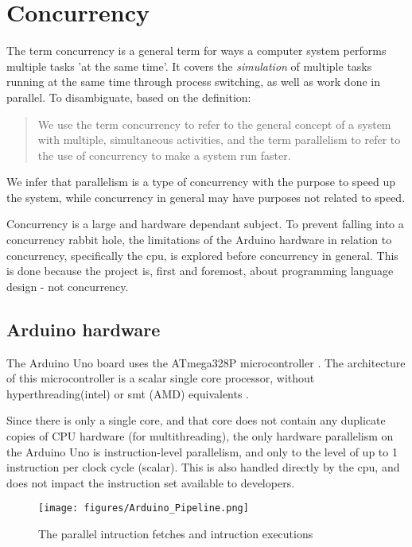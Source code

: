\section{Concurrency}\label{sec:concurrency}
The term concurrency is a general term for ways a computer system performs multiple tasks 'at the same time'. It covers the \textit{simulation} of multiple tasks running at the same time through process switching, as well as work done in parallel. To disambiguate, based on the definition:

\blockcquote{Bryant2016}{We use the term concurrency to refer to the general concept of a system with multiple, simultaneous activities, and the term parallelism to refer to the use of concurrency to make a system run faster.}

We infer that parallelism is a type of concurrency with the purpose to speed up the system, while concurrency in general may have purposes not related to speed.

Concurrency is a large and hardware dependant subject. To prevent falling into a concurrency rabbit hole, the limitations of the Arduino hardware in relation to concurrency, specifically the \gls{cpu}, is explored before concurrency in general. This is done because the project is, first and foremost, about programming language design - not concurrency.

\subsection{Arduino hardware}\label{subsec:arduinohardware}
The Arduino Uno board uses the ATmega328P microcontroller \cite{ArduinoUno}. The architecture of this microcontroller is a scalar single core processor, without hyperthreading(intel) or \gls{smt} (AMD) equivalents \cite{ATmega328P}.

Since there is only a single core, and that core does not contain any duplicate copies of CPU hardware (for multithreading), the only hardware parallelism on the Arduino Uno is instruction-level parallelism, and only to the level of up to 1 instruction per clock cycle (scalar). This is also handled directly by the \gls{cpu}, and does not impact the instruction set available to developers.


\begin{figure}[htb!]
    \centering
    \texttt{[image: figures/Arduino\_Pipeline.png]}
    \caption{The parallel intruction fetches and intruction executions \cite{ATmega328P}}
    \label{fig:arduinopipeline}
\end{figure}


